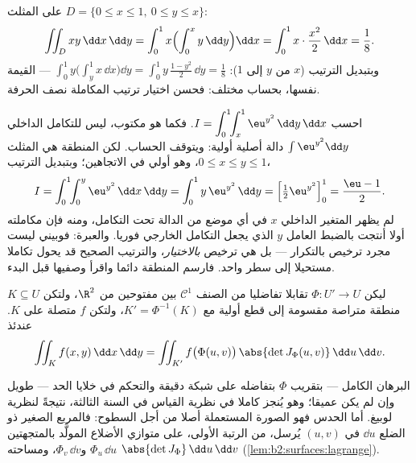 \begin{example}\label{ex:b2:multint:triangle}
على المثلث $D = \{0 \leq x \leq 1,\ 0 \leq y \leq x\}$:
\[
\iint_D xy \,\dd x\,\dd y
= \int_0^1 x\Bigl(\int_0^x y\,\dd y\Bigr)\dd x
= \int_0^1 x\cdot\frac{x^2}{2}\,\dd x = \frac18 .
\]
وبتبديل الترتيب ($x$ من $y$ إلى $1$): $\int_0^1
y\bigl(\int_y^1 x\,\dd x\bigr)\dd y = \int_0^1
y\,\frac{1 - y^2}{2}\,\dd y = \frac18$ --- القيمة
نفسها، بحساب مختلف: فحسن اختيار ترتيب المكاملة نصف الحرفة.
\end{example}

\begin{example}\label{ex:b2:multint:swaporder}
احسب $I = \displaystyle\int_0^1\!\!\int_x^1
\eu^{y^2}\,\dd y\,\dd x$. فكما هو مكتوب، ليس للتكامل الداخلي $\int\eu^{y^2}\dd y$ دالة أصلية
أولية: ويتوقف الحساب. لكن المنطقة هي المثلث $0 \leq
x \leq y \leq 1$، وهو أولي في
الاتجاهين؛ وبتبديل الترتيب،
\[
I = \int_0^1\!\!\int_0^y \eu^{y^2}\,\dd x\,\dd y
= \int_0^1 y\,\eu^{y^2}\,\dd y
= \Bigl[\tfrac12\eu^{y^2}\Bigr]_0^1 = \frac{\eu - 1}{2} .
\]
لم يظهر المتغير الداخلي $x$ في أي موضع من الدالة تحت التكامل،
ومنه فإن مكاملته أولا أنتجت بالضبط العامل $y$ الذي يجعل التكامل
الخارجي فوريا. والعبرة: فوبيني ليست مجرد ترخيص بالتكرار --- بل هي
ترخيص \emph{بالاختيار}، والترتيب الصحيح قد يحول تكاملا مستحيلا إلى
سطر واحد. فارسم المنطقة دائما واقرأ وصفيها قبل البدء.
\end{example}

\begin{theorem}\label{thm:b2:multint:changevar}
ليكن $\Phi \colon U' \to U$ تقابلا تفاضليا من الصنف $\mathcal{C}^1$ بين مفتوحين من $\R^2$،
ولتكن $K \subseteq U$ منطقة متراصة مقسومة إلى قطع أولية مع $K' = \Phi^{-1}(K)$، ولتكن
$f$ متصلة على $K$. عندئذ
\[
\iint_K f(x, y)\,\dd x\,\dd y
= \iint_{K'} f\bigl(\Phi(u, v)\bigr)\,
\abs{\det J_\Phi(u, v)}\,\dd u\,\dd v .
\]
\end{theorem}
\admitted

\begin{remark}
البرهان الكامل --- بتقريب $\Phi$ بتفاضله على شبكة دقيقة والتحكم في
خلايا الحد --- طويل وإن لم يكن عميقا؛ وهو يُنجز كاملا في نظرية
القياس في السنة الثالثة، نتيجةً لنظرية لوبيغ. أما الحدس فهو الصورة
المستعملة أصلا من أجل  السطوح: فالمربع الصغير ذو الضلع $\dd u$
في $(u, v)$ يُرسل، من الرتبة الأولى، على متوازي الأضلاع المولَّد
بالمتجهتين $\Phi_u\,\dd u$ و$\Phi_v\,\dd v$، ومساحته
$\abs{\det J_\Phi}\,\dd u\,\dd v$
(\cref{lem:b2:surfaces:lagrange}).
\end{remark}

